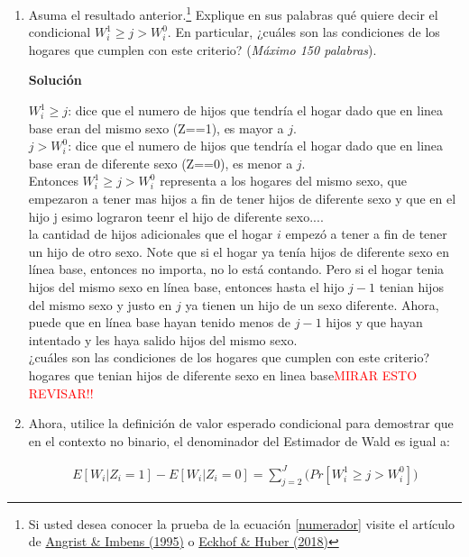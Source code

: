 \documentclass[a4paper, answers, addpoints, 11pt]{exam}
\newenvironment{solucion}{%
  \begin{mdframed}[
    backgroundcolor=blue!5,    %
    linecolor=blue!50,          %
    linewidth=2pt,              %
    leftmargin=10pt,            %
    rightmargin=8pt,           %
    topline=true,              %
    bottomline=true,            %
    roundcorner=10pt,           %
    innerleftmargin=10pt,       %
    innerrightmargin=10pt,      %
    innerbottommargin=10pt,     %
    innertopmargin=10pt         %
  ]%
  \begin{tcolorbox}[colframe=blue!50!black, colback=blue!50, coltitle=white, sharp corners=all, boxrule=1mm, width=\textwidth, halign=left, valign=center, top=0mm, bottom=0mm, left=0mm, right=0mm] \textbf{Solución} \end{tcolorbox} }{\end{mdframed}}
\begin{document}
\begin{enumerate}
\begin{enumerate}
            \item Asuma el resultado anterior.\footnote{\footnotesize{Si usted desea conocer la prueba de la ecuación \ref{numerador} visite el artículo de \href{https://www.jstor.org/stable/2291054}{Angrist \& Imbens (1995)}} o \href{https://ideas.repec.org/p/fri/fribow/fribow00492.html}{Eckhof \& Huber (2018)}} Explique en sus palabras qué quiere decir el condicional $W_i^1 \geq j > W_i^0$. En particular, ¿cuáles son las condiciones de los hogares que cumplen con este criterio? (\textit{Máximo 150 palabras}).
            \begin{solucion}
            $W_i^1 \geq j $: dice que el numero de hijos que tendría el hogar dado que en linea base eran del mismo sexo (Z==1), es mayor a $j$.\\
            $j > W_i^0 $: dice que el numero de hijos que tendría el hogar dado que en linea base eran de diferente sexo (Z==0), es menor a $j$.\\

            Entonces $W_i^1 \geq j > W_i^0$ representa a los hogares del mismo sexo, que empezaron a tener mas hijos a fin de tener hijos de diferente sexo y que en el hijo j esimo lograron teenr el hijo de diferente sexo....\\
            
            la cantidad de hijos adicionales que el hogar $i$ empezó a tener a fin de tener un hijo de otro sexo. Note que si el hogar ya tenía hijos de diferente sexo en línea base, entonces no importa, no lo está contando. Pero si el hogar tenia hijos del mismo sexo en línea base, entonces hasta el hijo $j-1$ tenian hijos del mismo sexo y justo en $j$ ya tienen un hijo de un sexo diferente. Ahora, puede que en línea base hayan tenido menos de $j-1$ hijos y que hayan intentado y les haya salido hijos del mismo sexo.\\

             ¿cuáles son las condiciones de los hogares que cumplen con este criterio? hogares que tenian hijos de diferente sexo en linea base\textcolor{red}{MIRAR ESTO REVISAR!!}
            
           
\end{solucion}
            \item Ahora, utilice la definición de valor esperado condicional para demostrar que en el contexto no binario, el denominador del Estimador de Wald es igual a:
            
            \begin{align}
                E[W_i | Z_i = 1 ] - E[W_i | Z_i = 0 ] = \sum_{j=2}^J \Big( Pr[W_i^1 \geq j > W_i^0] \Big) 
            \end{align}


\end{enumerate}
\end{enumerate}
\end{document}
